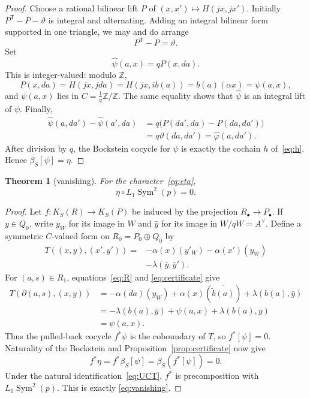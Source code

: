 \documentclass[11pt]{amsart}
\newtheorem{theorem}{Theorem}[section]
\theoremstyle{remark}
\newcommand{\Z}{\mathbb Z}
\newcommand{\Sym}{\operatorname{Sym}}
\begin{document}
\begin{proof}
Choose a rational bilinear lift $P$ of
$(x,x')\mapsto H(jx,jx')$.  Initially
$P^{\mathsf T}-P-\vartheta$ is integral and alternating.  Adding an
integral bilinear form supported in one triangle, we may and do arrange
\begin{equation}\label{eq:P}
                         P^{\mathsf T}-P=\vartheta.
\end{equation}
Set
\[
                  \widehat\psi(a,x)=qP(x,da).
\]
This is integer-valued: modulo $\Z$,
\[
 P(x,da)=H(jx,jda)=H(jx,ib(a))=b(a)(\alpha x)=\psi(a,x),
\]
and $\psi(a,x)$ lies in $C=\frac1q\Z/\Z$.  The same equality shows
that $\widehat\psi$ is an integral lift of $\psi$.  Finally,
\begin{align*}
 \widehat\psi(a,da')-\widehat\psi(a',da)
 &=q\bigl(P(da',da)-P(da,da')\bigr)\\
 &=q\vartheta(da,da')
 =\widehat\varphi(a,da').
\end{align*}
After division by $q$, the Bockstein cocycle for $\psi$ is exactly the
cochain $h$ of~\eqref{eq:h}.  Hence $\beta_S[\psi]=\eta$.
\end{proof}

\begin{theorem}[vanishing]\label{thm:vanishing}
For the character~\eqref{eq:eta},
\begin{equation}\label{eq:vanishing}
                       \eta\circ L_1\Sym^2(p)=0.
\end{equation}
\end{theorem}

\begin{proof}
Let $f:K_S(R)\to K_S(P)$ be induced by the projection
$R_\bullet\to P_\bullet$.  If $y\in Q_0$, write $y_W$ for its image in
$W$ and $\bar y$ for its image in $W/qW=A^\vee$.  Define a symmetric
$C$-valued form on $R_0=P_0\oplus Q_0$ by
\begin{equation}\label{eq:T}
\begin{split}
 T((x,y),(x',y'))={}&-\alpha(x)(y'_W)-\alpha(x')(y_W)\\
                    &-\lambda(\bar y,\bar y').
\end{split}
\end{equation}
For $(a,s)\in R_1$, equations~\eqref{eq:R} and
\eqref{eq:certificate} give
\begin{align*}
 T(\partial(a,s),(x,y))
 &=-\alpha(da)(y_W)
   +\alpha(x)(\overline{\widetilde b(a)})
   +\lambda(b(a),\bar y)\\
 &=-\lambda(b(a),\bar y)+\psi(a,x)
   +\lambda(b(a),\bar y)\\
 &=\psi(a,x).
\end{align*}
Thus the pulled-back cocycle $f^*\psi$ is the coboundary of $T$, so
$f^*[\psi]=0$.  Naturality of the Bockstein and
Proposition~\ref{prop:certificate} now give
\[
 f^*\eta=f^*\beta_S[\psi]
 =\beta_S(f^*[\psi])=0.
\]
Under the natural identification~\eqref{eq:UCT}, $f^*$ is
precomposition with $L_1\Sym^2(p)$.  This is exactly
\eqref{eq:vanishing}.
\end{proof}
\end{document}
